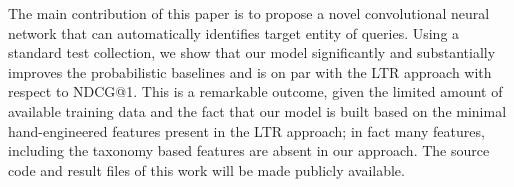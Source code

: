 The main contribution of this paper is to propose a novel convolutional neural network that can automatically identifies target entity of queries. Using a standard test collection, we show that our model  significantly and substantially improves the probabilistic baselines and is on par with the LTR approach with respect to NDCG@1. This is a remarkable outcome, given the limited amount of available training data and the fact that our model is built based on the minimal hand-engineered features present in the LTR approach; in fact many features, including the taxonomy based features are absent in our approach. The source code and result files of this work will be made publicly available.





